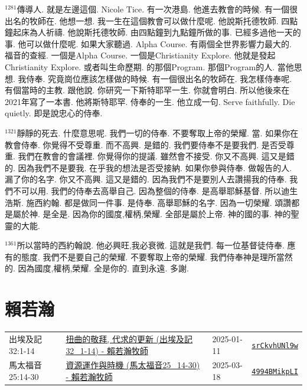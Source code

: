 \documentclass{book}
\begin{document}
$^{1281}$傳導人.
就是左邊這個.
Nicole Tice.
有一次港島.
他進去教會的時候.
有一個很出名的牧師在.
他想一想.
我一生在這個教會可以做什麼呢.
他說斯托德牧師.
四點鐘起床為人祈禱.
他說斯托德牧師.
由四點鐘到九點鐘所做的事.
已經多過他一天的事.
他可以做什麼呢.
如果大家聽過.
Alpha Course.
有兩個全世界影響力最大的.
福音的查經.
一個是Alpha Course.
一個是Christianity Explore.
他就是發起Christianity Explore.
或者叫生命歷期.
的那個Program.
那個Program的人.
當他思想.
我侍奉.
究竟崗位應該怎樣做的時候.
有一個很出名的牧師在.
我怎樣侍奉呢.
有個當時的主教.
跟他說.
你研究一下斯特耶罕一生.
你就會明白.
所以他後來在2021年寫了一本書.
他將斯特耶罕.
侍奉的一生.
他立成一句.
Serve faithfully.
Die quietly.
即是說忠心的侍奉.

$^{1321}$靜靜的死去.
什麼意思呢.
我們一切的侍奉.
不要奪取上帝的榮耀.
當.
如果你在教會侍奉.
你覺得不受尊重.
而不高興.
是錯的.
我們要侍奉不是要我們.
是否受尊重.
我們在教會的會議裡.
你覺得你的提議.
雖然會不接受.
你又不高興.
這又是錯的.
因為我們不是要我.
在乎我的想法是否受接納.
如果你參與侍奉.
做報告的人.
漏了你的名字.
你又不高興.
這又是錯的.
因為我們不是要別人去讚揚我的侍奉.
我們不可以用.
我們的侍奉去高舉自己.
因為整個的侍奉.
是高舉耶穌基督.
所以迪生浩斯.
施西約翰.
都是做同一件事.
是侍奉.
高舉耶穌的名字.
因為一切榮耀.
頌讚都是屬於神.
是全是.
因為你的國度,權柄,榮耀.
全部是屬於上帝.
神的國的事.
神的聖靈的大能.

$^{1361}$所以當時的西約翰說.
他必興旺,我必衰微.
這就是我們.
每一位基督徒侍奉.
應有的態度.
我們不是要自己的榮耀.
不要奪取上帝的榮耀.
我們侍奉神是理所當然的.
因為國度,權柄,榮耀.
全是你的.
直到永遠.
多謝.
\newpage



\chapter{賴若瀚}\label{ch:preacher13}
\begin{multicols}{3}
\minitoc
\end{multicols}
{ \scriptsize


\begin{xltabular}{\textwidth}{|p{0.15\textwidth} p{0.6\textwidth}|p{0.07\textwidth} p{0.1\textwidth}|}
\hline
出埃及記 32:1-14 & \hyperref[sec:srCkvhUNl9w]{扭曲的敬拜, 代求的更新 (出埃及記32\_1-14) -  賴若瀚牧師} & 2025-01-11 & \href{https://youtube.com/watch?v=srCkvhUNl9w}{\texttt{srCkvhUNl9w}} \\
馬太福音 25:14-30 & \hyperref[sec:4994BMikpLI]{資源運作與時機 (馬太福音25\_14-30) - 賴若瀚牧師} & 2025-03-18 & \href{https://youtube.com/watch?v=4994BMikpLI}{\texttt{4994BMikpLI}} \\
\hline
\end{xltabular}
}
\newpage
\end{document}
